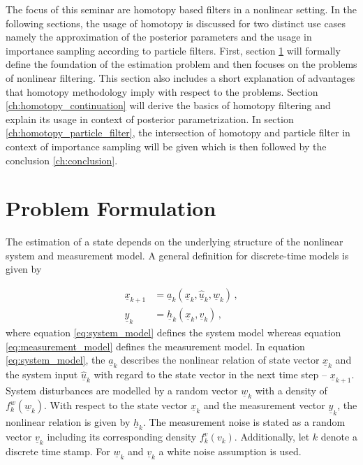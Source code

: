 \documentclass[a4paper]{IEEEtran}
\begin{document}
The focus of this seminar are homotopy based filters in a nonlinear setting. In the following sections, the usage of homotopy is discussed for two distinct use cases namely the approximation of the posterior parameters and the usage in importance sampling according to particle filters. First, section \ref{ch:problem_formulation} will formally define the foundation of the estimation problem and then focuses on the problems 
of nonlinear filtering. This section also includes a short explanation of advantages that homotopy methodology imply with respect to the problems. Section \ref{ch:homotopy_continuation} will derive the basics of homotopy filtering and explain its usage in context of posterior parametrization. In    section \ref{ch:homotopy_particle_filter}, the intersection of homotopy and particle filter in context of importance sampling will be given which is then followed by the conclusion \ref{ch:conclusion}.

\section{Problem Formulation}
\label{ch:problem_formulation}

The estimation of a state depends on the underlying structure of the nonlinear system and measurement model. A general definition for discrete-time models is given by

\begin{align}
    \underline{x}_{k+1}  &= \underline{a}_{k}(\underline{x}_{k}, \underline{\hat{u}}_{k},  \underline{w}_{k}) \,,  \label{eq:system_model} \\
    \underline{y}_{k}    &= \underline{h}_{k}(\underline{x}_{k}, \underline{v}_{k}) \,, \label{eq:measurement_model}
\end{align}
where equation \eqref{eq:system_model} defines the system model whereas equation \eqref{eq:measurement_model} defines the measurement model. In equation \eqref{eq:system_model}, 
the $\underline{a}_{k}$ describes the nonlinear relation of state vector $\underline{x}_{k}$ and the system input $\underline{\hat{u}}_{k}$ with regard to the state vector in the next time step -- $\underline{x}_{k+1}$.
System disturbances are modelled by a random vector $\underline{w}_{k}$ with a density of $f^{w}_{k}(\underline{w}_{k})$. With respect to the state vector $\underline{x}_{k}$ and the measurement vector $\underline{y}_{k}$,
the nonlinear relation is given by $\underline{h}_{k}$. The measurement noise is stated as a random vector $\underline{v}_{k}$ including its corresponding density $f^{v}_{k}(v_{k})$. Additionally, let $k$ denote a discrete time stamp.
For $\underline{w}_{k}$ and $\underline{v}_{k}$ a white noise assumption is used.
\end{document}
